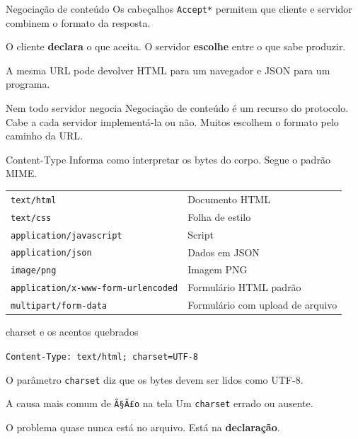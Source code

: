 \documentclass{beamer}
\begin{document}
\begin{frame}{Negociação de conteúdo}
  Os cabeçalhos \texttt{Accept*} permitem que cliente e servidor combinem o
  formato da resposta.

  \vspace{0.3cm}
  O cliente \textbf{declara} o que aceita. O servidor \textbf{escolhe} entre o
  que sabe produzir.

  \vspace{0.4cm}
  A mesma URL pode devolver HTML para um navegador e JSON para um programa.

  \vspace{0.5cm}
  \begin{alertblock}{Nem todo servidor negocia}
    Negociação de conteúdo é um recurso do protocolo. Cabe a cada servidor
    implementá-la ou não. Muitos escolhem o formato pelo caminho da URL.
  \end{alertblock}
\end{frame}

\begin{frame}{Content-Type}
  Informa como interpretar os bytes do corpo. Segue o padrão MIME.

  \begin{center}
    \footnotesize
    \begin{tabular}{@{}ll@{}}
      \toprule
      \texttt{text/html}    & Documento HTML \\
      \texttt{text/css}     & Folha de estilo \\
      \texttt{application/javascript} & Script \\
      \texttt{application/json}       & Dados em JSON \\
      \texttt{image/png}              & Imagem PNG \\
      \texttt{application/x-www-form-urlencoded} & Formulário HTML padrão \\
      \texttt{multipart/form-data}    & Formulário com upload de arquivo \\
      \bottomrule
    \end{tabular}
  \end{center}
\end{frame}

\begin{frame}{charset e os acentos quebrados}
  \begin{center}
    \large \texttt{Content-Type: text/html; charset=UTF-8}
  \end{center}

  \vspace{0.5cm}
  O parâmetro \texttt{charset} diz que os bytes devem ser lidos como UTF-8.

  \vspace{0.5cm}
  \begin{alertblock}{A causa mais comum de \texttt{Ã§Ã£o} na tela}
    Um \texttt{charset} errado ou ausente.

    \vspace{0.2cm}
    O problema quase nunca está no arquivo. Está na \textbf{declaração}.
  \end{alertblock}
\end{frame}
\end{document}
